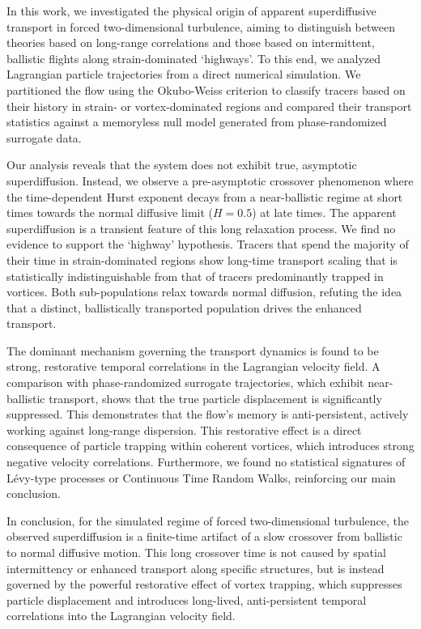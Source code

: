 \documentclass[]{article}
\begin{document}
In this work, we investigated the physical origin of apparent superdiffusive transport in forced two-dimensional turbulence, aiming to distinguish between theories based on long-range correlations and those based on intermittent, ballistic flights along strain-dominated `highways'. To this end, we analyzed Lagrangian particle trajectories from a direct numerical simulation. We partitioned the flow using the Okubo-Weiss criterion to classify tracers based on their history in strain- or vortex-dominated regions and compared their transport statistics against a memoryless null model generated from phase-randomized surrogate data.

Our analysis reveals that the system does not exhibit true, asymptotic superdiffusion. Instead, we observe a pre-asymptotic crossover phenomenon where the time-dependent Hurst exponent decays from a near-ballistic regime at short times towards the normal diffusive limit ($H=0.5$) at late times. The apparent superdiffusion is a transient feature of this long relaxation process. We find no evidence to support the `highway' hypothesis. Tracers that spend the majority of their time in strain-dominated regions show long-time transport scaling that is statistically indistinguishable from that of tracers predominantly trapped in vortices. Both sub-populations relax towards normal diffusion, refuting the idea that a distinct, ballistically transported population drives the enhanced transport.

The dominant mechanism governing the transport dynamics is found to be strong, restorative temporal correlations in the Lagrangian velocity field. A comparison with phase-randomized surrogate trajectories, which exhibit near-ballistic transport, shows that the true particle displacement is significantly suppressed. This demonstrates that the flow's memory is anti-persistent, actively working against long-range dispersion. This restorative effect is a direct consequence of particle trapping within coherent vortices, which introduces strong negative velocity correlations. Furthermore, we found no statistical signatures of Lévy-type processes or Continuous Time Random Walks, reinforcing our main conclusion.

In conclusion, for the simulated regime of forced two-dimensional turbulence, the observed superdiffusion is a finite-time artifact of a slow crossover from ballistic to normal diffusive motion. This long crossover time is not caused by spatial intermittency or enhanced transport along specific structures, but is instead governed by the powerful restorative effect of vortex trapping, which suppresses particle displacement and introduces long-lived, anti-persistent temporal correlations into the Lagrangian velocity field.
\end{document}
